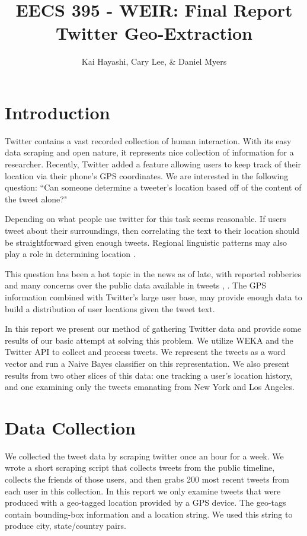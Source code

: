 \documentclass[12pt]{article}
\title{EECS 395 - WEIR: Final Report \\ Twitter Geo-Extraction}
\author{Kai Hayashi, Cary Lee, \& Daniel Myers}
\date{}                                           %
\begin{document}
\maketitle
\section*{Introduction}
Twitter contains a vast recorded collection of human interaction. With its easy data scraping and open nature, it represents nice collection of information for a researcher. Recently, Twitter added a feature allowing users to keep track of their location via their phone's GPS coordinates. We are interested in the following question: ``Can someone determine a tweeter's location based off of the content of the tweet alone?" 

Depending on what people use twitter for this task seems reasonable. If users tweet about their surroundings, then correlating the text to their location should be straightforward given enough tweets. Regional linguistic patterns may also play a role in determining location \cite{Zcheng}.

This question has been a hot topic in the news as of late, with reported robberies and many concerns over the public data available in tweets \cite{twrob}, \cite{twpriv}. The GPS information combined with Twitter's large user base, may provide enough data to build a distribution of user locations given the tweet text. 

In this report we present our method of gathering Twitter data and provide some results of our basic attempt at solving this problem. We utilize WEKA and the Twitter API to collect and process tweets. We represent the tweets as a word vector and run a Naive Bayes classifier on this representation. We also present results from two other slices of this data: one tracking a user's location history, and one examining only the tweets emanating from New York and Los Angeles. 

\section*{Data Collection}
We collected the tweet data by scraping twitter once an hour for a week. We wrote a short scraping script that collects tweets from the public timeline, collects the friends of those users, and then grabs 200 most recent tweets from each user in this collection. In this report we only examine tweets that were produced with a geo-tagged location provided by a GPS device. The geo-tags contain bounding-box information and a location string. We used this string to produce city, state/country pairs. 
\end{document}
